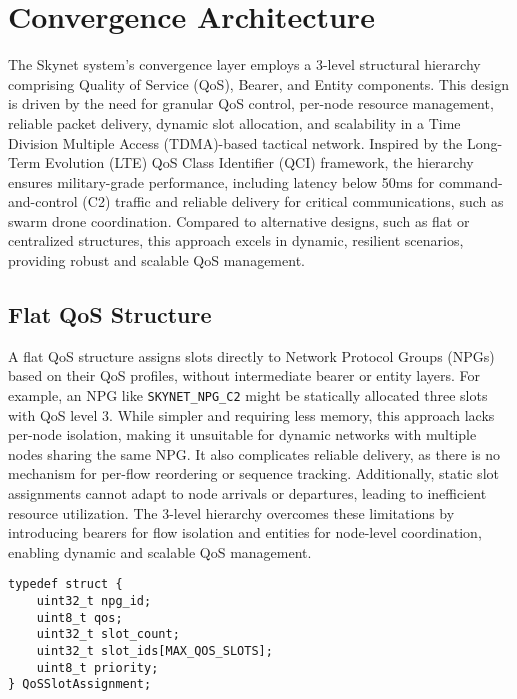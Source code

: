 \documentclass{article}
\begin{document}
\section{Convergence Architecture}
The Skynet system's convergence layer employs a 3-level structural hierarchy comprising Quality of
Service (QoS), Bearer, and Entity components. This design is driven by the need for granular QoS
control, per-node resource management, reliable packet delivery, dynamic slot allocation, and
scalability in a Time Division Multiple Access (TDMA)-based tactical network. Inspired by the
Long-Term Evolution (LTE) QoS Class Identifier (QCI) framework, the hierarchy ensures military-grade
performance, including latency below 50ms for command-and-control (C2) traffic and reliable delivery
for critical communications, such as swarm drone coordination. Compared to alternative designs, such
as flat or centralized structures, this approach excels in dynamic, resilient scenarios, providing
robust and scalable QoS management.

\subsection{Flat QoS Structure}
A flat QoS structure assigns slots directly to Network Protocol Groups (NPGs) based on their QoS
profiles, without intermediate bearer or entity layers. For example, an NPG like
\texttt{SKYNET\_NPG\_C2} might be statically allocated three slots with QoS level 3. While simpler
and requiring less memory, this approach lacks per-node isolation, making it unsuitable for dynamic
networks with multiple nodes sharing the same NPG. It also complicates reliable delivery, as there is
no mechanism for per-flow reordering or sequence tracking. Additionally, static slot assignments
cannot adapt to node arrivals or departures, leading to inefficient resource utilization. The 3-level
hierarchy overcomes these limitations by introducing bearers for flow isolation and entities for
node-level coordination, enabling dynamic and scalable QoS management.

\begin{lstlisting}
typedef struct {
    uint32_t npg_id;
    uint8_t qos;
    uint32_t slot_count;
    uint32_t slot_ids[MAX_QOS_SLOTS];
    uint8_t priority;
} QoSSlotAssignment;
\end{lstlisting}
\end{document}
